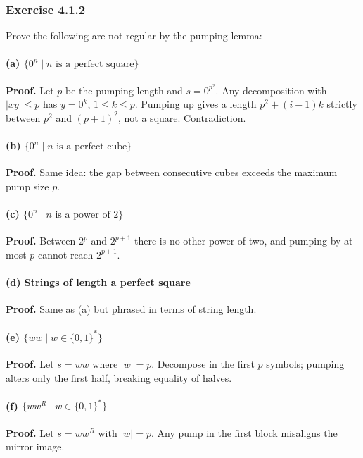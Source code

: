 \documentclass{article}
\theoremstyle{theorem}
\theoremstyle{definition}
\theoremstyle{remark}
\begin{document}
\subsubsection{Exercise 4.1.2}
Prove the following are not regular by the pumping lemma:

\paragraph{(a) \(\{0^n\mid n\text{ is a perfect square}\}\)}
\textbf{Proof.} Let \(p\) be the pumping length and \(s=0^{p^2}\). Any decomposition with \(\lvert xy\rvert\le p\) has \(y=0^k\), \(1\le k\le p\). Pumping up gives a length \(p^2 + (i-1)k\) strictly between \(p^2\) and \((p+1)^2\), not a square. Contradiction.

\paragraph{(b) \(\{0^n\mid n\text{ is a perfect cube}\}\)}
\textbf{Proof.} Same idea: the gap between consecutive cubes exceeds the maximum pump size \(p\).

\paragraph{(c) \(\{0^n\mid n\text{ is a power of 2}\}\)}
\textbf{Proof.} Between \(2^p\) and \(2^{p+1}\) there is no other power of two, and pumping by at most \(p\) cannot reach \(2^{p+1}\).

\paragraph{(d) Strings of length a perfect square}
\textbf{Proof.} Same as (a) but phrased in terms of string length.

\paragraph{(e) \(\{ww\mid w\in\{0,1\}^*\}\)}
\textbf{Proof.} Let \(s=ww\) where \(\lvert w\rvert=p\). Decompose in the first \(p\) symbols; pumping alters only the first half, breaking equality of halves.

\paragraph{(f) \(\{ww^R\mid w\in\{0,1\}^*\}\)}
\textbf{Proof.} Let \(s= w w^R\) with \(\lvert w\rvert=p\). Any pump in the first block misaligns the mirror image.
\end{document}

